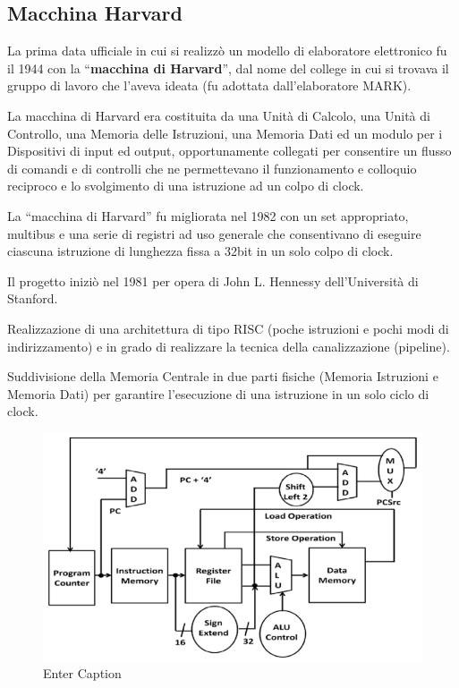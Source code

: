 \documentclass[12pt]{article} %
\begin{document}
\subsection{Macchina Harvard}
La prima data ufficiale in cui si realizzò un modello di elaboratore elettronico fu il 1944 con la “\textbf{macchina di Harvard}”, dal nome del college in cui si trovava il gruppo di lavoro che l’aveva ideata (fu adottata dall’elaboratore MARK). \par\medskip\noindent
La macchina di Harvard era costituita da una Unità di Calcolo, una Unità di Controllo, una Memoria delle Istruzioni, una Memoria Dati ed un modulo per i Dispositivi di input ed output, opportunamente collegati per consentire un flusso di comandi e di controlli che ne permettevano il funzionamento e colloquio reciproco e lo svolgimento di una istruzione ad un colpo di clock.\par\medskip\noindent
La “macchina di Harvard” fu migliorata nel 1982 con un set appropriato, multibus e una serie di registri ad uso generale che consentivano di eseguire ciascuna istruzione di lunghezza fissa a 32bit in un solo colpo di clock.\par\medskip\noindent
Il progetto iniziò nel 1981 per opera di John L. Hennessy dell’Università di Stanford.\par\medskip\noindent
Realizzazione di una architettura di tipo RISC (poche istruzioni e pochi modi di indirizzamento) e in grado di realizzare la tecnica della canalizzazione (pipeline).\par\medskip\noindent
Suddivisione della Memoria Centrale in due parti fisiche (Memoria Istruzioni e Memoria Dati) per garantire l'esecuzione di una istruzione in un solo ciclo di clock.\par\medskip\noindent 
\begin{figure}[h]
    \centering
    \includegraphics[width=0.75\linewidth]{harvard.png}
    \caption{Enter Caption}
\end{figure}
\end{document}
